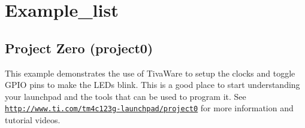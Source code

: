 \hypertarget{group__example__list}{}\section{Example\+\_\+list}
\label{group__example__list}
\subsection*{Project Zero (project0)}

This example demonstrates the use of Tiva\+Ware to setup the clocks and toggle G\+P\+IO pins to make the L\+ED\textquotesingle{}s blink. This is a good place to start understanding your launchpad and the tools that can be used to program it. See \href{http://www.ti.com/tm4c123g-launchpad/project0}{\tt http\+://www.\+ti.\+com/tm4c123g-\/launchpad/project0} for more information and tutorial videos. 